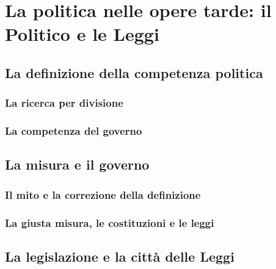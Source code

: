 \chapter{La politica nelle opere tarde: il Politico e le Leggi}
\label{cap:platone:leggi}

\section{La definizione della competenza politica}

\subsection{La ricerca per divisione}

\subsection{La competenza del governo}

\section{La misura e il governo}

\subsection{Il mito e la correzione della definizione}

\subsection{La giusta misura, le costituzioni e le leggi}

\section{La legislazione e la città delle Leggi}


